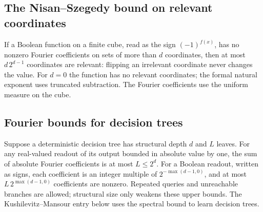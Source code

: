 \begin{result}
\subsection{The Nisan--Szegedy bound on relevant coordinates}
If a Boolean function on a finite cube, read as the sign $(-1)^{f(x)}$,
has no nonzero Fourier coefficients on sets of more than $d$ coordinates,
then at most $d\,2^{d-1}$ coordinates are relevant: flipping an irrelevant
coordinate never changes the value. For $d=0$ the function has no relevant
coordinates; the formal natural exponent uses truncated subtraction.
The Fourier coefficients use the uniform measure on the cube.
\citep{NisanSzegedy1994,ODonnell2014}
\end{result}

\begin{result}
\subsection{Fourier bounds for decision trees}
Suppose a deterministic decision tree has structural depth $d$ and $L$ leaves.
For any real-valued readout of its output bounded in absolute value by one,
the sum of absolute Fourier coefficients is at most $L\le2^d$.
For a Boolean readout, written as signs, each coefficient is an integer multiple
of $2^{-\max(d-1,0)}$, and at most $L\,2^{\max(d-1,0)}$ coefficients are nonzero.
Repeated queries and unreachable branches are allowed; structural size only
weakens these upper bounds. The Kushilevitz--Mansour entry below uses the
spectral bound to learn decision trees.\citep{KushilevitzMansour1993,ODonnell2014}
\end{result}

